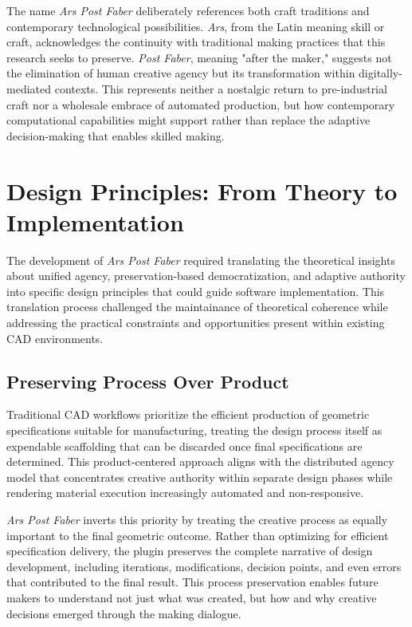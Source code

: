 \vspace{0.5cm}

The name \textit{Ars Post Faber} deliberately references both craft traditions and contemporary technological possibilities. \textit{Ars}, from the Latin meaning skill or craft, acknowledges the continuity with traditional making practices that this research seeks to preserve. \textit{Post Faber}, meaning "after the maker," suggests not the elimination of human creative agency but its transformation within digitally-mediated contexts. This represents neither a nostalgic return to pre-industrial craft nor a wholesale embrace of automated production, but how contemporary computational capabilities might support rather than replace the adaptive decision-making that enables skilled making.

\section{Design Principles: From Theory to Implementation}

The development of \textit{Ars Post Faber} required translating the theoretical insights about unified agency, preservation-based democratization, and adaptive authority into specific design principles that could guide software implementation. This translation process challenged the maintainance of theoretical coherence while addressing the practical constraints and opportunities present within existing CAD environments.

\subsection{Preserving Process Over Product}

Traditional CAD workflows prioritize the efficient production of geometric specifications suitable for manufacturing, treating the design process itself as expendable scaffolding that can be discarded once final specifications are determined. This product-centered approach aligns with the distributed agency model that concentrates creative authority within separate design phases while rendering material execution increasingly automated and non-responsive.

\vspace{0.5cm}

\textit{Ars Post Faber} inverts this priority by treating the creative process as equally important to the final geometric outcome. Rather than optimizing for efficient specification delivery, the plugin preserves the complete narrative of design development, including iterations, modifications, decision points, and even errors that contributed to the final result. This process preservation enables future makers to understand not just what was created, but how and why creative decisions emerged through the making dialogue.

